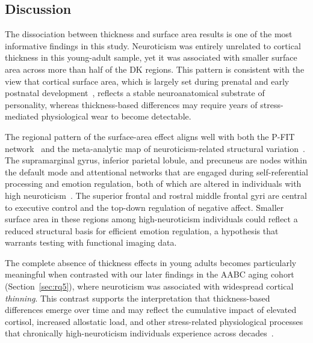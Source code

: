 \subsection{Discussion}

The dissociation between thickness and surface area results is one of the most informative findings in this study.
Neuroticism was entirely unrelated to cortical thickness in this young-adult sample, yet it was associated with smaller surface area across more than half of the DK regions.
This pattern is consistent with the view that cortical surface area, which is largely set during prenatal and early postnatal development~\cite{grasby2020genetic}, reflects a stable neuroanatomical substrate of personality, whereas thickness-based differences may require years of stress-mediated physiological wear to become detectable.

The regional pattern of the surface-area effect aligns well with both the P-FIT network~\cite{jung2007pfit} and the meta-analytic map of neuroticism-related structural variation~\cite{servaas2015neuroticism}.
The supramarginal gyrus, inferior parietal lobule, and precuneus are nodes within the default mode and attentional networks that are engaged during self-referential processing and emotion regulation, both of which are altered in individuals with high neuroticism~\cite{servaas2015neuroticism}.
The superior frontal and rostral middle frontal gyri are central to executive control and the top-down regulation of negative affect.
Smaller surface area in these regions among high-neuroticism individuals could reflect a reduced structural basis for efficient emotion regulation, a hypothesis that warrants testing with functional imaging data.

The complete absence of thickness effects in young adults becomes particularly meaningful when contrasted with our later findings in the AABC aging cohort (Section~\ref{sec:rq5}), where neuroticism was associated with widespread cortical \textit{thinning}.
This contrast supports the interpretation that thickness-based differences emerge over time and may reflect the cumulative impact of elevated cortisol, increased allostatic load, and other stress-related physiological processes that chronically high-neuroticism individuals experience across decades~\cite{lupien2009effects, mcewen2006protective}.

